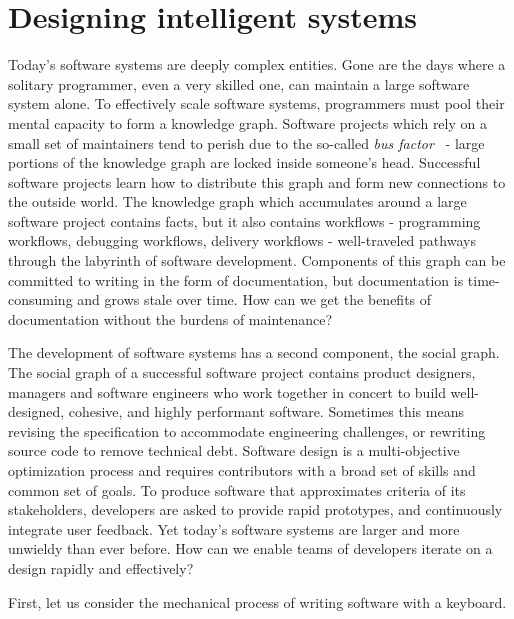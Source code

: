 \documentclass[12pt,initial,twoside,maitrise]{dms}
\numberwithin{equation}{section}
\numberwithin{table}{chapter}
\numberwithin{figure}{chapter}
\begin{document}
\section{Designing intelligent systems}

Today's software systems are deeply complex entities. Gone are the days where a solitary programmer, even a very skilled one, can maintain a large software system alone. To effectively scale software systems, programmers must pool their mental capacity to form a knowledge graph. Software projects which rely on a small set of maintainers tend to perish due to the so-called \textit{bus factor}~\cite{cosentino2015assessing} - large portions of the knowledge graph are locked inside someone's head. Successful software projects learn how to distribute this graph and form new connections to the outside world. The knowledge graph which accumulates around a large software project contains facts, but it also contains workflows - programming workflows, debugging workflows, delivery workflows - well-traveled pathways through the labyrinth of software development. Components of this graph can be committed to writing in the form of documentation, but documentation is time-consuming and grows stale over time. How can we get the benefits of documentation without the burdens of maintenance?

The development of software systems has a second component, the social graph. The social graph of a successful software project contains product designers, managers and software engineers who work together in concert to build well-designed, cohesive, and highly performant software. Sometimes this means revising the specification to accommodate engineering challenges, or rewriting source code to remove technical debt. Software design is a multi-objective optimization process and requires contributors with a broad set of skills and common set of goals. To produce software that approximates criteria of its stakeholders, developers are asked to provide rapid prototypes, and continuously integrate user feedback. Yet today's software systems are larger and more unwieldy than ever before. How can we enable teams of developers iterate on a design rapidly and effectively?

First, let us consider the mechanical process of writing software with a keyboard.
\end{document}
